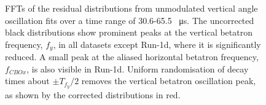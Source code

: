 \begin{figure}[t!]
\centering{}
\hfill
{}
\caption{FFTs of the residual distributions from unmodulated vertical angle oscillation fits over a time range of 30.6-65.5 \SI{}{\micro\second}. The uncorrected black distributions show prominent peaks at the vertical betatron frequency, $f_{y}$, in all datasets except Run-1d, where it is significantly reduced. A small peak at the aliased horizontal betatron frequency, $f_{CBOx}$, is also visible in Run-1d. Uniform randomisation of decay times about $\pm T_{f_{y}}/2$ removes the vertical betatron oscillation peak, as shown by the corrected distributions in red.}
\label{fig:EarlyTimeFFTsOverlay}
\end{figure}

